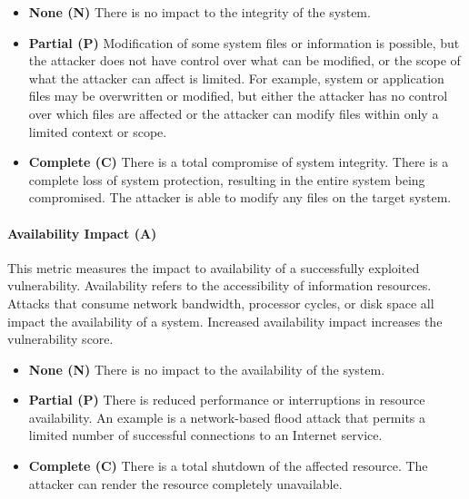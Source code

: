           \begin{itemize}
            \item
              \textbf{None (N)} There is no impact to the integrity of the system.
            \item
              \textbf{Partial (P)} Modification of some system files or information
              is possible, but the attacker does not have control over what can be
              modified, or the scope of what the attacker can affect is limited. For
              example, system or application files may be overwritten or modified,
              but either the attacker has no control over which files are affected
              or the attacker can modify files within only a limited context or
              scope.
            \item
              \textbf{Complete (C)} There is a total compromise of system integrity.
              There is a complete loss of system protection, resulting in the entire
              system being compromised. The attacker is able to modify any files on
              the target system.
          \end{itemize}

        \paragraph{Availability Impact (A)}\label{par:availability-impact-a}

          This metric measures the impact to availability of a successfully
          exploited vulnerability. Availability refers to the accessibility of
          information resources. Attacks that consume network bandwidth,
          processor cycles, or disk space all impact the availability of a
          system. Increased availability impact increases the vulnerability
          score.

          \begin{itemize}
            \item
              \textbf{None (N)} There is no impact to the availability of the
              system.
            \item
              \textbf{Partial (P)} There is reduced performance or interruptions
              in resource availability. An example is a network-based flood
              attack that permits a limited number of successful connections to
              an Internet service.
            \item
              \textbf{Complete (C)} There is a total shutdown of the affected
              resource. The attacker can render the resource completely
              unavailable.
          \end{itemize}


